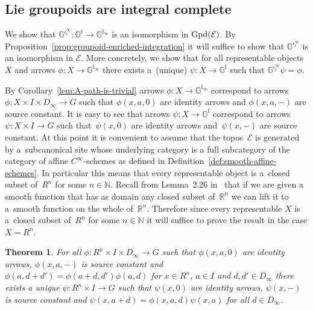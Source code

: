 \documentclass[10pt,a4paper]{amsart}
\numberwithin{equation}{section}
\newtheorem{Theorem}{Theorem}[section]
\begin{document}
\subsection{Lie groupoids are integral complete}\label{sec:Lie Groupoids are Integral Complete}

We show that $\mathbb{G}^{\iota_{\mathbb{I}}^{\infty}}\colon \mathbb{G}^{\mathbb{I}} \rightarrow\mathbb{G}^{\mathbb{I}_{\infty}}$ is an isomorphism in ${\rm Gpd}(\mathcal{E})$. By Proposition~\ref{prop:groupoid-enriched-integration} it will suf\/f\/ice to show that $\mathbb{G}^{\iota_{\mathbb{I}}^{\infty}}$ is an isomorphism in $\mathcal{E}$. More concretely, we show that for all representable objects $X$ and arrows $\phi\colon X \rightarrow \mathbb{G}^{\mathbb{I}_{\infty}}$ there exists a~(unique) $\psi\colon X \rightarrow \mathbb{G}^{\mathbb{I}}$ such that $\mathbb{G}^{\iota_{\mathbb{I}}^{\infty}}\psi=\phi$.

By Corollary~\ref{lem:A-path-is-trivial} arrows $\phi\colon X \rightarrow \mathbb{G}^{\mathbb{I}_{\infty}}$ correspond to arrows $\phi\colon X\times I\times D_{\infty} \rightarrow G$ such that $\phi(x,a,0)$ are identity arrows and $\phi(x,a,-)$ are source constant. It is easy to see that arrows $\psi\colon X \rightarrow \mathbb{G}^{\mathbb{I}}$ correspond to arrows $\psi\colon X\times I \rightarrow G$ such that~$\psi(x,0)$ are identity arrows and~$\psi(x,-)$ are source constant. At this point it is convenient to assume that the topos~$\mathcal{E}$ is generated by a~subcanonical site whose underlying category is a full subcategory of the category of af\/f\/ine $C^{\infty}$-schemes as def\/ined in Def\/inition~\ref{def:smooth-affine-schemes}. In particular this means that every representable object is a~closed subset of~$R^n$ for some $n\in \mathbb{N}$. Recall from Lemma~2.26 in~\cite{MR2954043} that if we are given a smooth function that has as domain any closed subset of~$\mathbb{R}^n$ we can lift it to a~smooth function on the whole of~$\mathbb{R}^n$. Therefore since every representable $X$ is a~closed subset of~$R^n$ for some $n\in \mathbb{N}$ it will suf\/f\/ice to prove the result in the case $X=R^n$.


\begin{Theorem}For all $\phi\colon R^n\times I \times D_{\infty} \rightarrow G$ such that $\phi(x,a,0)$ are identity arrows, $\phi(x,a,-)$
is source constant and $\phi(a,d+d')=\phi(a+d,d')\phi(a,d)$ for $x\in R^n$, $a\in I$ and $d,d'\in D_{\infty}$ there exists a unique $\psi\colon R^n\times I \rightarrow G$ such that $\psi(x,0)$ are identity arrows, $\psi(x,-)$ is source constant and $\psi(x,a+d)=\phi(x,a,d)\psi(x,a)$ for all $d\in D_{\infty}$.
\end{Theorem}
\end{document}
